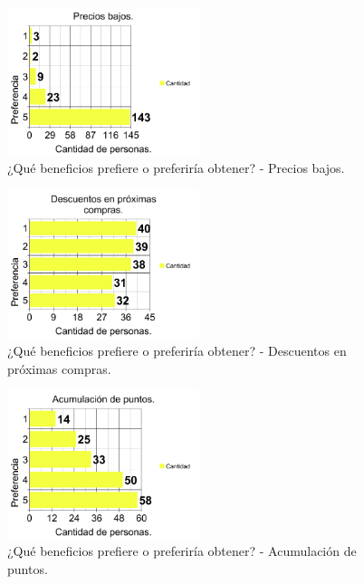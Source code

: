 \begin{figure}[!htb]
  \centering
  \includegraphics[width=0.5\textwidth]{images/chartPreg7_1.png}
  \caption[chart7-1]{¿Qué beneficios prefiere o preferiría obtener? - Precios bajos.}
  \label{fig:chart2}
\end{figure}

\begin{figure}[!htb]
  \centering
  \includegraphics[width=0.5\textwidth]{images/chartPreg7_2.png}
  \caption[chart7-2]{¿Qué beneficios prefiere o preferiría obtener? - Descuentos en próximas compras.}
  \label{fig:chart2}
\end{figure}

\begin{figure}[!htb]
  \centering
  \includegraphics[width=0.5\textwidth]{images/chartPreg7_3.png}
  \caption[chart7-3]{¿Qué beneficios prefiere o preferiría obtener? - Acumulación de puntos.}
  \label{fig:chart2}
\end{figure}

